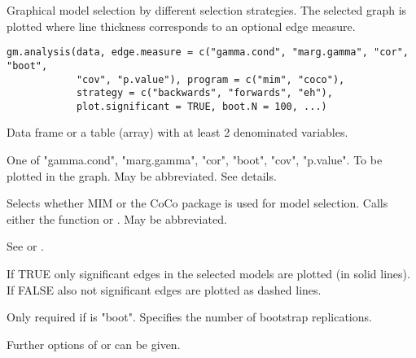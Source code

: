 \begin{Description}\relax
Graphical model selection by different selection strategies. 
The selected graph is plotted where line thickness corresponds to an optional edge measure.
\end{Description}
\begin{Usage}
\begin{verbatim}
gm.analysis(data, edge.measure = c("gamma.cond", "marg.gamma", "cor", "boot",
            "cov", "p.value"), program = c("mim", "coco"),
            strategy = c("backwards", "forwards", "eh"), 
            plot.significant = TRUE, boot.N = 100, ...)
\end{verbatim}
\end{Usage}
\begin{Arguments}
\begin{ldescription}
\item[\code{data}] Data frame or a table (array) with at least 2 denominated variables. 
\item[\code{edge.measure}] One of "gamma.cond", "marg.gamma", "cor", "boot", "cov", "p.value". To be plotted in the graph. May be abbreviated. See details. 
\item[\code{program}] Selects whether MIM or the CoCo package is used for model selection. Calls either the function
 or . May be abbreviated. 
\item[\code{strategy}] See  or . 
\item[\code{plot.significant}] If TRUE only significant edges in the selected models are plotted (in solid lines). If FALSE also not significant edges are plotted as dashed lines.

\item[\code{boot.N}] Only required if  is "boot". Specifies the number of bootstrap replications. 
\item[\code{...}] Further options of  or  can be given. 
\end{ldescription}
\end{Arguments}
